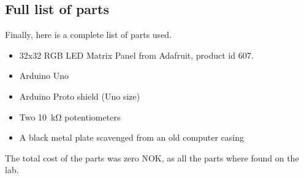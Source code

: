 \documentclass{article}
\begin{document}
\subsection{Full list of parts}
Finally, here is a complete list of parts used.
\begin{itemize}
\item 32x32 RGB LED Matrix Panel from Adafruit, product id 607.
\item Arduino Uno
\item Arduino Proto shield (Uno size)
\item Two \SI{10}{\kilo\ohm} potentiometers
\item A black metal plate scavenged from an old computer casing
\end{itemize}
The total cost of the parts was zero NOK, as all the parts where found on the lab.
\end{document}
